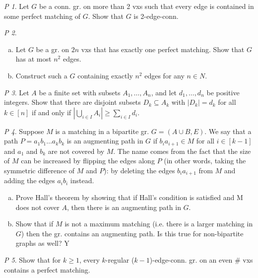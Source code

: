 \documentclass[11pt, fleqn, a4paper, landscape]{article}
\theoremstyle{plain} %
\theoremstyle{remark} %
\newtheorem{problem}{P}
\theoremstyle{definition} %
\begin{document}
\begin{multicols}{5}
\begin{problem}
Let $G$ be a conn. gr. on more than 2 vxs such that every edge is
contained in some perfect matching of $G$. Show that $G$ is 2-edge-conn.
\end{problem}

\begin{problem}
\begin{enumerate}[(a)]
\item Let $G$ be a gr. on $2n$ vxs that has exactly one perfect matching. Show that $G$ has at most $n^2$ edges.
\item Construct such a $G$ containing exactly $n^2$ edges for any $n \in N$.
\end{enumerate}
\end{problem}

\begin{problem}
Let $A$ be a finite set with subsets $A_1,\dots, A_n$, and let $d_1,\dots, d_n$ be positive integers. Show that there are disjoint subsets $D_k \subseteq A_k$ with $|D_k| = d_k$ for all $k \in [n]$ if and
only if $|\bigcup_{i\in I}A_i|\ge \sum_{i\in I}d_i$.
\end{problem}

\begin{problem}
Suppose $M$ is a matching in a bipartite gr. $G = (A\cup B,E)$. We say that a path $P = a_1b_1\dots a_kb_k$ is an augmenting path in $G$ if $b_ia_{i+1}\in M$ for all $i\in [k - 1]$ and $a_1$ and $b_k$ are not covered by $M$. The name comes from the fact that the size of $M$ can be increased
by 
flipping the edges along $P$ (in other words, taking the symmetric difference of $M$ and $P$): by deleting the edges $b_ia_{i+1}$ from $M$ and adding the edges $a_ib_i$ instead.
\begin{enumerate}[(a)]
\item Prove Hall's theorem by showing that if Hall's condition is satisfied and M does not cover $A$, then there is an augmenting path in $G$.
\item Show that if $M$ is not a maximum matching (i.e. there is a larger matching in $G$) then the gr. contains an augmenting path. Is this true for non-bipartite graphs as well? Y
\end{enumerate}
\end{problem}

\begin{problem}
Show that for $k\ge 1$, every $k$-regular ($k- 1$)-edge-conn. gr. on an even \# vxs contains a perfect matching.
\end{problem}


\end{multicols}
\end{document}
